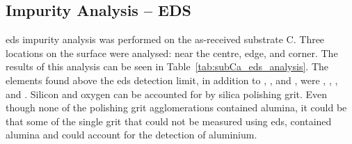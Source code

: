 
\subsection{Impurity Analysis -- EDS}

\Ac{eds} impurity analysis was performed on the as-received substrate C. Three locations on the surface were analysed: near the centre, edge, and corner. The results of this analysis can be seen in Table~\ref{tab:subCa_eds_analysis}. The elements found above the \ac{eds} detection limit, in addition to , , and , were , , , and . Silicon and oxygen can be accounted for by silica polishing grit. Even though none of the polishing grit agglomerations contained alumina, it could be that some of the single grit that could not be measured using \ac{eds}, contained alumina and could account for the detection of aluminium.

